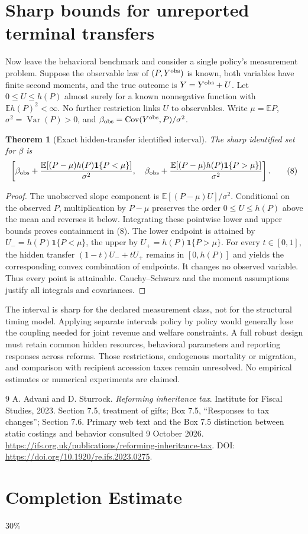 \documentclass[11pt]{article}
\newtheorem{theorem}{Theorem}
\theoremstyle{remark}
\newcommand{\E}{\mathbb E}
\newcommand{\Var}{\operatorname{Var}}
\newcommand{\Cov}{\operatorname{Cov}}
\newcommand{\Ind}{\mathbf 1}
\begin{document}
\section{Sharp bounds for unreported terminal transfers}
Now leave the behavioral benchmark and consider a single policy's
measurement problem. Suppose the observable law of $(P,Y^{\rm obs})$ is
known, both variables have finite second moments, and the true outcome is
$Y=Y^{\rm obs}+U$. Let $0\leq U\leq h(P)$ almost surely for a known
nonnegative function with $\E h(P)^2<\infty$. No further restriction links
$U$ to observables. Write $\mu=\E P$, $\sigma^2=\Var(P)>0$, and
$\beta_{\rm obs}=\Cov(Y^{\rm obs},P)/\sigma^2$.

\begin{theorem}[Exact hidden-transfer identified interval]
The sharp identified set for $\beta$ is
\[
 \left[
 \beta_{\rm obs}+\frac{\E[(P-\mu)h(P)\Ind\{P<\mu\}]}{\sigma^2},\quad
 \beta_{\rm obs}+\frac{\E[(P-\mu)h(P)\Ind\{P>\mu\}]}{\sigma^2}
 \right]. \tag{8}
\]
\end{theorem}
\begin{proof}
The unobserved slope component is
$\E[(P-\mu)U]/\sigma^2$. Conditional on the observed $P$, multiplication
by $P-\mu$ preserves the order $0\leq U\leq h(P)$ above the mean
and reverses it below. Integrating these pointwise lower and upper bounds
proves containment in (8). The lower endpoint is attained by
$U_-=h(P)\Ind\{P<\mu\}$, the upper by
$U_+=h(P)\Ind\{P>\mu\}$. For every $t\in[0,1]$, the hidden transfer
$(1-t)U_-+tU_+$ remains in $[0,h(P)]$ and yields the corresponding convex
combination of endpoints. It changes no observed variable. Thus every
point is attainable. Cauchy--Schwarz and the moment assumptions justify
all integrals and covariances.
\end{proof}
The interval is sharp for the declared measurement class, not for the
structural timing model. Applying separate intervals policy by policy
would generally lose the coupling needed for joint revenue and welfare
constraints. A full robust design must retain common hidden resources,
behavioral parameters and reporting responses across reforms. Those
restrictions, endogenous mortality or migration, and comparison with
recipient accession taxes remain unresolved. No empirical estimates or
numerical experiments are claimed.

\begin{thebibliography}{9}
 A. Advani and D. Sturrock.
\emph{Reforming inheritance tax}. Institute for Fiscal Studies, 2023.
Section 7.5, treatment of gifts; Box 7.5, ``Responses to tax changes'';
Section 7.6. Primary web text and the Box 7.5 distinction between static
costings and behavior consulted 9 October 2026.
\url{https://ifs.org.uk/publications/reforming-inheritance-tax}.
DOI: \url{https://doi.org/10.1920/re.ifs.2023.0275}.
\end{thebibliography}

\section{Completion Estimate}
30\%
\end{document}
